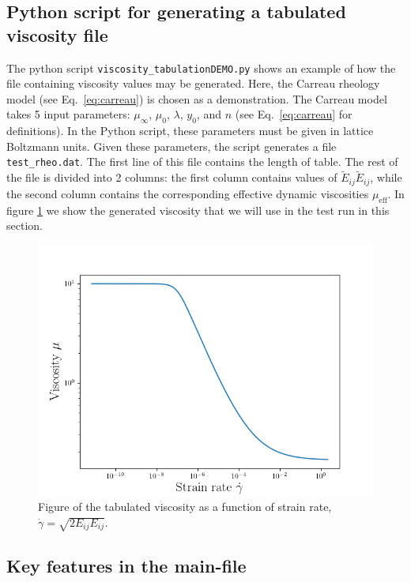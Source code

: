 \documentclass[11pt,a4paper]{report}
\begin{document}
\subsection{Python script for generating a tabulated viscosity file} \label{subsec:py_visc}

The python script \texttt{viscosity\_tabulationDEMO.py} shows an example of how the file containing viscosity values may be generated. Here, the Carreau rheology model (see Eq.~\eqref{eq:carreau}) is chosen as a demonstration. The Carreau model takes 5 input parameters: $\mu_\infty$, $\mu_0$, $\lambda$, $y_0$, and $n$ (see Eq.~\eqref{eq:carreau} for definitions). In the Python script, these parameters must be given in lattice Boltzmann units. Given these parameters, the script generates a file \texttt{test\_rheo.dat}. The first line of this file contains the length of table. The rest of the file is divided into 2 columns: the first column contains values of $\widetilde{E}_{ij}\widetilde{E}_{ij}$, while the second column contains the corresponding effective dynamic viscosities $\mu_\mathrm{eff}$. In figure \ref{fig:carreau plot} we show the generated viscosity that we will use in the test run in this section.
\begin{figure}
	\centering
	\includegraphics[width=0.7\linewidth]{Figures/carreau_plot.png}
	\caption{Figure of the tabulated viscosity as a function of strain rate, $\dot{\gamma} = \sqrt{2E_{ij}E_{ij}}$.}
	\label{fig:carreau plot}
\end{figure} 

\subsection{Key features in the main-file}
\end{document}
